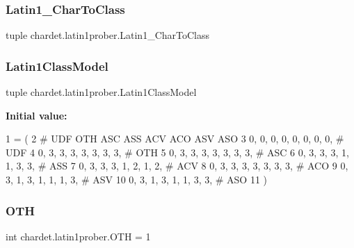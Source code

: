 \mbox{\label{namespacechardet_1_1latin1prober_a47ace28713715789a9dccd79d3d7cffe}} 
\subsubsection{\texorpdfstring{Latin1\+\_\+\+Char\+To\+Class}{Latin1\_CharToClass}}
{\footnotesize\ttfamily tuple chardet.\+latin1prober.\+Latin1\+\_\+\+Char\+To\+Class}

\mbox{\label{namespacechardet_1_1latin1prober_aa61d9475089515b6d78a30e1b7a9697f}} 
\subsubsection{\texorpdfstring{Latin1\+Class\+Model}{Latin1ClassModel}}
{\footnotesize\ttfamily tuple chardet.\+latin1prober.\+Latin1\+Class\+Model}

{\bfseries Initial value\+:}
\begin{DoxyCode}
1 =  (
2 \textcolor{comment}{# UDF OTH ASC ASS ACV ACO ASV ASO}
3     0,  0,  0,  0,  0,  0,  0,  0,  \textcolor{comment}{# UDF}
4     0,  3,  3,  3,  3,  3,  3,  3,  \textcolor{comment}{# OTH}
5     0,  3,  3,  3,  3,  3,  3,  3,  \textcolor{comment}{# ASC}
6     0,  3,  3,  3,  1,  1,  3,  3,  \textcolor{comment}{# ASS}
7     0,  3,  3,  3,  1,  2,  1,  2,  \textcolor{comment}{# ACV}
8     0,  3,  3,  3,  3,  3,  3,  3,  \textcolor{comment}{# ACO}
9     0,  3,  1,  3,  1,  1,  1,  3,  \textcolor{comment}{# ASV}
10     0,  3,  1,  3,  1,  1,  3,  3,  \textcolor{comment}{# ASO}
11 )
\end{DoxyCode}
\mbox{\label{namespacechardet_1_1latin1prober_a6371206a72b164e925eeaf37e4c9e924}} 
\subsubsection{\texorpdfstring{O\+TH}{OTH}}
{\footnotesize\ttfamily int chardet.\+latin1prober.\+O\+TH = 1}

